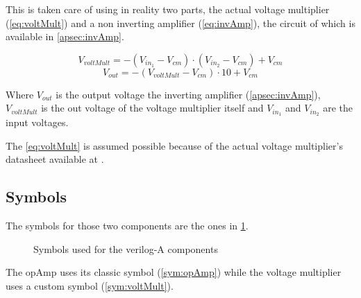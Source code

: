 This is taken care of using in reality two parts, the actual voltage multiplier (\cref{eq:voltMult}) and a non inverting amplifier (\cref{eq:invAmp}), the circuit of which is available in \cref{apsec:invAmp}.

\begin{equation}\label{eq:voltMult}
  V_{voltMult}=-(V_{in_1}-V_{cm})\cdot (V_{in_2}-V_{cm}) + V_{cm}
\end{equation}
\begin{equation}\label{eq:invAmp}
  V_{out}=-(V_{voltMult}-V_{cm})\cdot10+V_{cm}
\end{equation}

Where $V_{out}$ is the output voltage the inverting amplifier (\cref{apsec:invAmp}), $V_{voltMult}$ is the out voltage of the voltage multiplier itself and $V_{in_1}$ and $V_{in_2}$ are the input voltages.

The \cref{eq:voltMult} is assumed possible because of the actual voltage multiplier's datasheet available at \cite{actualVoltMult}.

\subsection{Symbols}

The symbols for those two components are the ones in \cref{sym:models}.

\begin{figure}[H]
  \centering
  \hspace*{2cm}
  \hfill
  \hspace*{2cm}
  \caption{Symbols used for the verilog-A components}
  \label{sym:models}
\end{figure}

The \ac{opAmp} uses its classic symbol (\cref{sym:opAmp}) while the voltage multiplier uses a custom symbol (\cref{sym:voltMult}).
